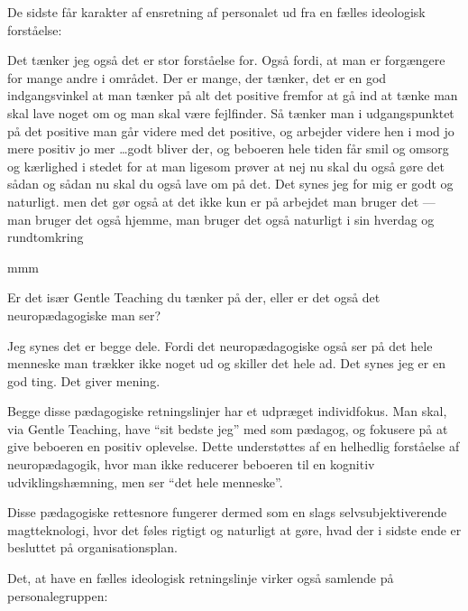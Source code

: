 De sidste får karakter af ensretning af personalet ud fra en fælles ideologisk forståelse:
\begin{description}

\AMB
Det tænker jeg også det er stor forståelse for. Også fordi, at man er forgængere for mange andre i området.
Der er mange, der tænker, det er en god indgangsvinkel at man tænker på alt det positive fremfor at gå ind at tænke man skal lave noget om og man skal være fejlfinder.
Så tænker man i udgangspunktet på det positive man går videre med det positive, og arbejder videre hen i mod jo mere positiv jo mer \ldots godt bliver der, og beboeren hele tiden får smil og omsorg og kærlighed i stedet for at man ligesom prøver at nej nu skal du også gøre det sådan og sådan nu skal du også lave om på det.
Det synes jeg for mig er godt og naturligt. men det gør også at det ikke kun er på arbejdet man bruger det — man bruger det også hjemme, man bruger det også naturligt i sin hverdag og rundtomkring

\DMC
mmm

\MAA
Er det især Gentle Teaching du tænker på der, eller er det også det neuropædagogiske man ser?

\AMB
Jeg synes det er begge dele. Fordi det neuropædagogiske også ser på det hele menneske man  trækker ikke noget ud og skiller det hele ad.
Det synes jeg er en god ting.
Det giver mening.
\end{description}

Begge disse pædagogiske retningslinjer har et udpræget individfokus.
Man skal, via Gentle Teaching, have “sit bedste jeg” med som pædagog, og fokusere på at give beboeren en positiv oplevelse.
Dette understøttes af en helhedlig forståelse af neuropædagogik, hvor man ikke reducerer beboeren til en kognitiv udviklingshæmning, men ser “det hele menneske”.

Disse pædagogiske rettesnore fungerer dermed som en slags selvsubjektiverende magtteknologi, hvor det føles rigtigt og naturligt at gøre, hvad der i sidste ende er besluttet på organisationsplan.

Det, at have en fælles ideologisk retningslinje virker også samlende på personalegruppen:


